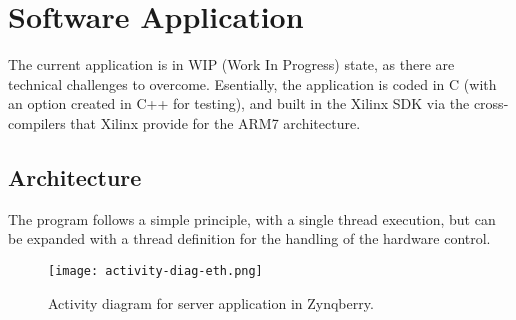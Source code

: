 %  
%  
%  
%  
%  
%  

\chapter{Software Application} \label{software-application}

The current application is in WIP (Work In Progress) state, as there are technical challenges to
overcome. Esentially, the application is coded in C (with an option created in C++ for testing), and
built in the Xilinx SDK via the cross-compilers that Xilinx provide for the ARM7 architecture.

\section{Architecture}

The program follows a simple principle, with a single thread execution, but can be expanded with a
thread definition for the handling of the hardware control.

\begin{figure}[htp]
	\centering
	\texttt{[image: activity-diag-eth.png]}
	\caption{Activity diagram for server application in Zynqberry.}
	\label{fig:activity-diag-eth}
\end{figure}

